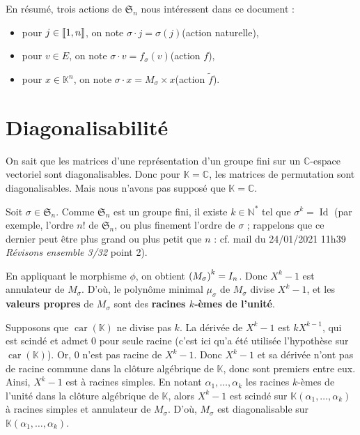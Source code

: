 \documentclass[10pt,a4paper,french,landscape]{article}
\DeclarePairedDelimiter\parenlong{\lparen}{\rparen}
\newcommand{\paren}[1]{\parenlong*{#1}}
\DeclarePairedDelimiter\bracketlong{\llbracket}{\rrbracket}
\newcommand{\br}[1]{\bracketlong*{#1}}
\theoremstyle{definition}
\theoremstyle{remark}
\DeclareMathOperator{\Id}{Id}
\DeclareMathOperator{\car}{car}
\newcommand{\NNs}{\mathbb N^*}
\newcommand{\CC}{\mathbb C}
\newcommand{\KK}{\mathbb K}
\newcommand{\Sy}{\mathfrak{S}}
\newcommand{\1}{\mathbbm{1}}
\newcommand{\Sn}[1][n]{\Sy_{#1}}
\begin{document}
\begin{multicols*}{2}
En résumé, trois actions de $\Sn$ nous intéressent dans ce document :
\begin{itemize}
\item pour $j\in\br{1,n}$, on note $\sigma\cdot j = \sigma(j)$\quad (action naturelle),
\item pour $v\in E$, on note $\sigma\cdot v = f_\sigma(v)$\quad (action $f$),
\item pour $x\in \KK^n$, on note $\sigma\cdot x = M_\sigma\times x$\quad (action $\tilde{f}$).
\end{itemize}

\section{Diagonalisabilité}
\label{sec:diago}

On sait que les matrices d'une représentation d'un groupe fini sur un $\CC$-espace vectoriel sont diagonalisables. Donc pour $\KK=\CC$, les matrices de permutation sont diagonalisables. Mais nous n'avons pas supposé que $\KK=\CC$.

Soit $\sigma\in\Sn$. Comme $\Sn$ est un groupe fini, il existe $k\in\NNs$ tel que $\sigma^{k}=\Id$ (par exemple, l'ordre $n!$ de $\Sn$, ou plus finement l'ordre de $\sigma$ ; rappelons que ce dernier peut être plus grand ou plus petit que $n$ : cf. mail du 24/01/2021 11h39 \textit{Révisons ensemble 3/32} point 2).

En appliquant le morphisme $\phi$, on obtient $\paren{M_\sigma}^{k}=I_n$. Donc $X^{k}-1$ est annulateur de $M_\sigma$. D'où, le polynôme minimal $\mu_\sigma$ de $M_\sigma$ divise $X^{k}-1$, et les \textbf{valeurs propres} de $M_\sigma$ sont des \textbf{racines $k$-èmes de l'unité}.

Supposons que $\car(\KK)$ ne divise pas $k$. La dérivée de $X^{k}-1$ est $kX^{k-1}$, qui est scindé et admet 0 pour seule racine (c'est ici qu'a été utilisée l'hypothèse sur $\car(\KK)$). Or, 0 n'est pas racine de $X^k-1$. Donc $X^k-1$ et sa dérivée n'ont pas de racine commune dans la clôture algébrique de $\KK$, donc sont premiers entre eux. Ainsi, $X^k-1$ est à racines simples. En notant $\alpha_1, \ldots , \alpha_k$ les racines $k$-èmes de l'unité dans la clôture algébrique de $\KK$, alors $X^k-1$ est scindé sur $\KK(\alpha_1, \ldots , \alpha_k)$ à racines simples et annulateur de $M_\sigma$. D'où, $M_\sigma$ est diagonalisable sur $\KK(\alpha_1, \ldots , \alpha_k)$.

\medskip


\end{multicols*}
\end{document}
